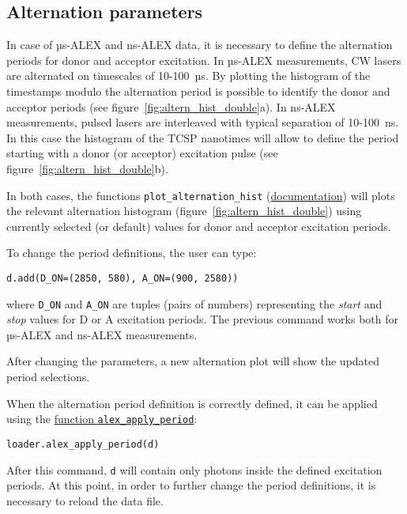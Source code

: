 \subsection{Alternation parameters}
\label{sec:alternation}

In case of µs-ALEX and ns-ALEX data, it is necessary to define the
alternation periods for donor and acceptor excitation. 
In µs-ALEX measurements, CW lasers are alternated on timescales of 10-100~µs.
By plotting the histogram of the timestamps modulo the alternation period
is possible to identify the donor and acceptor periods (see figure~\ref{fig:altern_hist_double}a).
In ns-ALEX measurements, pulsed lasers are interleaved with typical separation of 10-100~ns.
In this case the histogram of the TCSP nanotimes will allow to define the period
starting with a donor (or acceptor) excitation pulse (see figure~\ref{fig:altern_hist_double}b).

In both cases, the functions
\verb|plot_alternation_hist| (\href{http://fretbursts.readthedocs.org/en/latest/plots.html#fretbursts.burst\_plot.plot\_alternation\_hist}{documentation})
will plots the relevant alternation histogram (figure~\ref{fig:altern_hist_double}) 
using currently selected (or default) values for donor and acceptor excitation periods.

To change the period definitions, the user can type:

\begin{lstlisting}
d.add(D_ON=(2850, 580), A_ON=(900, 2580))
\end{lstlisting}

where \verb|D_ON| and \verb|A_ON| are tuples (pairs of numbers) representing
the \textit{start} and \textit{stop} values for D or A excitation periods.
The previous command works both for µs-ALEX and ns-ALEX measurements.

After changing the parameters, a new alternation plot will show the updated 
period selections.

When the alternation period definition is correctly defined, it can
be applied using the
\href{http://fretbursts.readthedocs.org/en/latest/loader.html#fretbursts.loader.alex_apply_period}{function \texttt{alex\_apply\_period}}:

\begin{lstlisting}
loader.alex_apply_period(d)
\end{lstlisting}

After this command, \verb|d| will contain only photons inside the defined excitation periods. 
At this point, in order to further change the period definitions,
it is necessary to reload the data file.

